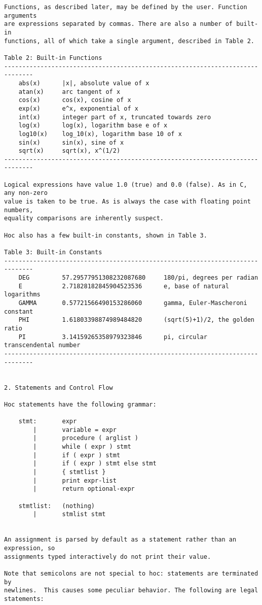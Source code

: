 \begin{verbatim}
Functions, as described later, may be defined by the user. Function arguments
are expressions separated by commas. There are also a number of built-in
functions, all of which take a single argument, described in Table 2.

Table 2: Built-in Functions
------------------------------------------------------------------------------
    abs(x)      |x|, absolute value of x
    atan(x)     arc tangent of x
    cos(x)      cos(x), cosine of x
    exp(x)      e^x, exponential of x
    int(x)      integer part of x, truncated towards zero
    log(x)      log(x), logarithm base e of x
    log10(x)    log_10(x), logarithm base 10 of x
    sin(x)      sin(x), sine of x
    sqrt(x)     sqrt(x), x^(1/2)
------------------------------------------------------------------------------

Logical expressions have value 1.0 (true) and 0.0 (false). As in C, any non-zero
value is taken to be true. As is always the case with floating point numbers,
equality comparisons are inherently suspect.

Hoc also has a few built-in constants, shown in Table 3.

Table 3: Built-in Constants
------------------------------------------------------------------------------
    DEG         57.29577951308232087680     180/pi, degrees per radian
    E           2.71828182845904523536      e, base of natural logarithms
    GAMMA       0.57721566490153286060      gamma, Euler-Mascheroni constant
    PHI         1.61803398874989484820      (sqrt(5)+1)/2, the golden ratio
    PI          3.14159265358979323846      pi, circular transcendental number
------------------------------------------------------------------------------


2. Statements and Control Flow

Hoc statements have the following grammar:

    stmt:       expr
        |       variable = expr
        |       procedure ( arglist )
        |       while ( expr ) stmt
        |       if ( expr ) stmt
        |       if ( expr ) stmt else stmt
        |       { stmtlist }
        |       print expr-list
        |       return optional-expr

    stmtlist:   (nothing)
        |       stmlist stmt


An assignment is parsed by default as a statement rather than an expression, so
assignments typed interactively do not print their value.

Note that semicolons are not special to hoc: statements are terminated by
newlines.  This causes some peculiar behavior. The following are legal
statements:


\end{verbatim}
